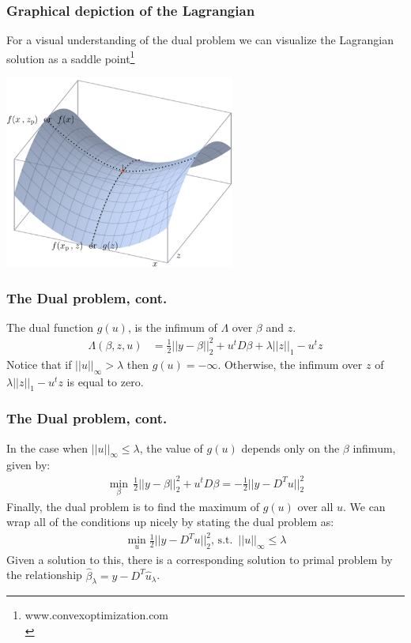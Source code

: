 \begin{frame}
  \frametitle{Graphical depiction of the Lagrangian}
  \small

  For a visual understanding of the dual problem we can visualize the
  Lagrangian solution as a saddle point\footnote{www.convexoptimization.com \\}

  \vspace{-0in}

  \begin{center}
  \includegraphics[height=2.5in]{img/saddle}
  \end{center}

\end{frame}

\begin{frame}
  \frametitle{The Dual problem, cont.}
  \footnotesize

  The dual function $g(u)$, is the infimum of $\Lambda$ over $\beta$ and $z$.
  \begin{align}
  \Lambda(\beta, z, u) &= \frac{1}{2} || y - \beta ||_2^2 +u^{t} D\beta + \lambda ||z||_1 - u^{t} z
  \end{align}
  Notice that if $||u||_\infty > \lambda$ then $g(u) = -\infty$. Otherwise, the infimum over
  $z$ of $\lambda ||z||_1 - u^t z$ is equal to zero.

\end{frame}

\begin{frame}
  \frametitle{The Dual problem, cont.}
  \footnotesize

  In the case when $||u||_\infty \leq \lambda$, the value of $g(u)$ depends only on the
  $\beta$ infimum, given by:
  \begin{align}
  \min_{\beta} \, \frac{1}{2} || y - \beta ||_2^2 +u^{t} D\beta = - \frac{1}{2} || y - D^T u ||_2^2
  \end{align}
  Finally, the dual problem is to find the maximum of $g(u)$ over all $u$. We can wrap all
  of the conditions up nicely by stating the dual problem as:
  \begin{align}
  \min_u \frac{1}{2} || y - D^T u ||_2^2, \, \text{s.t.} \, \, \, ||u||_\infty \leq \lambda
  \end{align}
  Given a solution to this, there is a corresponding solution to primal problem by the
  relationship $\widehat{\beta}_\lambda = y - D^T \widehat{u}_\lambda$.

\end{frame}

